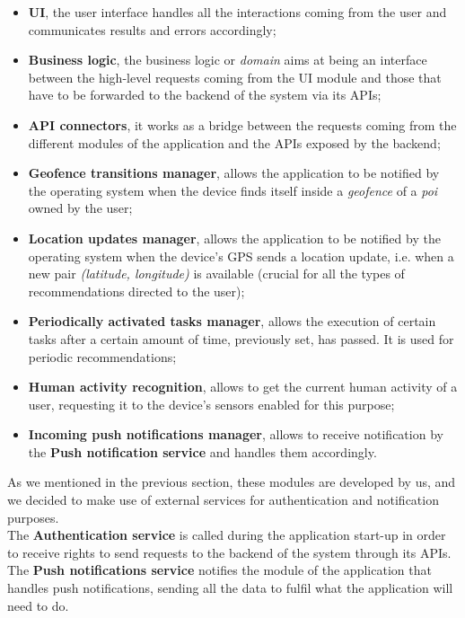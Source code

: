 \documentclass[../../main]{subfiles}
\begin{document}
\begin{itemize}
    \item \textbf{UI}, the user interface handles all the interactions coming from the user and communicates results and errors accordingly;
    \item \textbf{Business logic}, the business logic or \textit{domain} aims at being an interface between the high-level requests coming from the UI module and those that have to be forwarded to the backend of the system via its APIs;
    \item \textbf{API connectors}, it works as a bridge between the requests coming from the different modules of the application and the APIs exposed by the backend;
    \item \textbf{Geofence transitions manager}, allows the application to be notified by the operating system when the device finds itself inside a \textit{geofence} of a \textit{poi} owned by the user;
    \item \textbf{Location updates manager}, allows the application to be notified by the operating system when the device's GPS sends a location update, i.e. when a new pair \textit{(latitude, longitude)} is available (crucial for all the types of recommendations directed to the user);
    \item \textbf{Periodically activated tasks manager}, allows the execution of certain tasks after a certain amount of time, previously set, has passed. It is used for periodic recommendations;
    \item \textbf{Human activity recognition}, allows to get the current human activity of a user, requesting it to the device's sensors enabled for this purpose;
    \item \textbf{Incoming push notifications manager}, allows to receive notification by the \textbf{Push notification service} and handles them accordingly.
\end{itemize}
As we mentioned in the previous section, these modules are developed by us, and we decided to make use of external services for authentication and notification purposes.\\
The \textbf{Authentication service} is called during the application start-up in order to receive rights to send requests to the backend of the system through its APIs.
The \textbf{Push notifications service} notifies the module of the application that handles push notifications, sending all the data to fulfil what the application will need to do.
\end{document}
